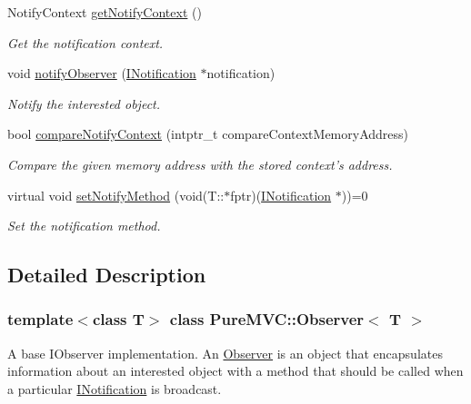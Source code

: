 \begin{DoxyCompactItemize}
NotifyContext \hyperlink{class_pure_m_v_c_1_1_observer_a9d05ea77d3a20be680ea85e305643ed5}{getNotifyContext} ()
\begin{DoxyCompactList}\small\item\em Get the notification context. \item\end{DoxyCompactList}\item 
void \hyperlink{class_pure_m_v_c_1_1_observer_a79996aa1a9b0d7e03c333ec177df74f1}{notifyObserver} (\hyperlink{class_pure_m_v_c_1_1_i_notification}{INotification} $\ast$notification)
\begin{DoxyCompactList}\small\item\em Notify the interested object. \item\end{DoxyCompactList}\item 
bool \hyperlink{class_pure_m_v_c_1_1_observer_a1b8be3d83deabe4c0c820af7821459a1}{compareNotifyContext} (intptr\_\-t compareContextMemoryAddress)
\begin{DoxyCompactList}\small\item\em Compare the given memory address with the stored context's address. \item\end{DoxyCompactList}\item 
virtual void \hyperlink{class_pure_m_v_c_1_1_i_observer_templated_a6d8b0b888b2d1efd0801b75451e7c8df}{setNotifyMethod} (void(T::$\ast$fptr)(\hyperlink{class_pure_m_v_c_1_1_i_notification}{INotification} $\ast$))=0
\begin{DoxyCompactList}\small\item\em Set the notification method. \item\end{DoxyCompactList}\end{DoxyCompactItemize}


\subsection{Detailed Description}
\subsubsection*{template$<$class T$>$ class PureMVC::Observer$<$ T $>$}

A base {\ttfamily IObserver} implementation. An {\ttfamily \hyperlink{class_pure_m_v_c_1_1_observer}{Observer}} is an object that encapsulates information about an interested object with a method that should be called when a particular {\ttfamily \hyperlink{class_pure_m_v_c_1_1_i_notification}{INotification}} is broadcast. 

